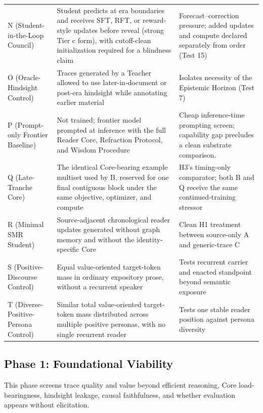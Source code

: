 \documentclass[11pt]{article}
\begin{document}
\begin{longtable}{
  >{\raggedright\arraybackslash}p{3.1cm}
  >{\raggedright\arraybackslash}p{5.5cm}
  >{\raggedright\arraybackslash}p{6.4cm}}
        N (Student-in-the-Loop Council) & Student predicts at era boundaries and receives SFT, RFT, or reward-style updates before reveal (strong Tier c form), with cutoff-clean initialization required for a blindness claim & Forecast--correction pressure; added updates and compute declared separately from order (Test 15) \\
        O (Oracle-Hindsight Control) & Traces generated by a Teacher allowed to use later-in-document or post-era hindsight while annotating earlier material & Isolates necessity of the Epistemic Horizon (Test 7) \\
        P (Prompt-only Frontier Baseline) & Not trained; frontier model prompted at inference with the full Reader Core, Refraction Protocol, and Wisdom Procedure & Cheap inference-time prompting screen; capability gap precludes a clean substrate comparison. \\
        Q (Late-Tranche Core) & The identical Core-bearing example multiset used by B, reserved for one final contiguous block under the same objective, optimizer, and compute & H3's timing-only comparator; both B and Q receive the same continued-training stressor \\
        R (Minimal SMR Student) & Source-adjacent chronological reader updates generated without graph memory and without the identity-specific Core & Clean H1 treatment between source-only A and generic-trace C \\
        S (Positive-Discourse Control) & Equal value-oriented target-token mass in ordinary expository prose, without a recurrent speaker & Tests recurrent carrier and enacted standpoint beyond semantic exposure \\
        T (Diverse-Positive-Persona Control) & Similar total value-oriented target-token mass distributed across multiple positive personas, with no single recurrent reader & Tests one stable reader position against persona diversity \\
\end{longtable}
\endgroup

\subsection{Phase 1: Foundational Viability}
\label{sec:phase1}

This phase screens trace quality and value beyond efficient reasoning, Core
load-bearingness, hindsight leakage, causal faithfulness, and whether evaluation
appears without elicitation.
\end{document}
